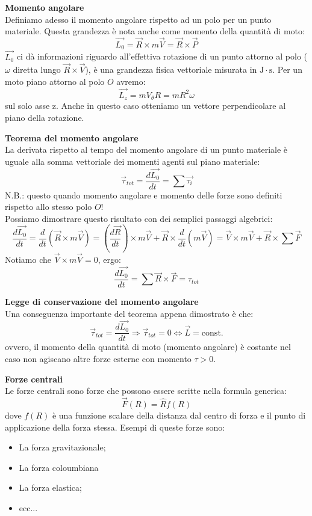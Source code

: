 \documentclass[a4paper,12pt]{article}
\begin{document}
\par\smallskip
\textbf{Momento angolare} \\
Definiamo adesso il momento angolare rispetto ad un polo per un punto materiale. Questa grandezza è nota anche come
momento della quantità di moto:
$$ \vec{L_0} = \vec{R} \times m\vec{V} = \vec{R} \times \vec{P} $$
$\vec{L_0}$ ci dà informazioni riguardo all'effettiva rotazione di un punto attorno al polo ($\omega$ diretta lungo $\vec{R}\times\vec{V}$),
è una grandezza fisica vettoriale misurata in $\mathrm{J}\cdot\mathrm{s}$. Per un moto piano attorno al polo $O$ avremo:
$$ \vec{L_z} = mV_{\theta}R = mR^2\omega$$
sul solo asse z. Anche in questo caso otteniamo un vettore perpendicolare al piano della rotazione.
\par\smallskip
\textbf{Teorema del momento angolare} \\
La derivata rispetto al tempo del momento angolare di un punto materiale è uguale alla somma vettoriale dei momenti agenti
sul piano materiale:
$$ \vec{\tau}_{tot} = \frac{d\vec{L_0}}{dt} = \sum \vec{\tau_i} $$
N.B.: questo quando momento angolare e momento delle forze sono definiti rispetto allo stesso polo $O$!\\
Possiamo dimostrare questo risultato con dei semplici passaggi algebrici:
$$ \frac{d\vec{L_0}}{dt} = \frac{d}{dt} (\vec{R} \times m\vec{V}) = (\frac{d\vec{R}}{dt}) \times m\vec{V} + \vec{R} \times \frac{d}{dt}(m\vec{V}) = \vec{V}\times m\vec{V}+\vec{R}\times\sum{\vec{F}} $$
Notiamo che $\vec{V} \times m\vec{V} = 0$, ergo:
$$ \frac{d\vec{L_0}}{dt} = \sum \vec{R} \times \vec{F} = \tau_{tot} $$
\par\smallskip
\textbf{Legge di conservazione del momento angolare} \\
Una conseguenza importante del teorema appena dimostrato è che:
$$ \vec{\tau}_{tot} = \frac{d\vec{L_0}}{dt} \Rightarrow \vec{\tau}_{tot} = 0 \Leftrightarrow \vec{L} = \mathrm{const.}$$
ovvero, il momento della quantità di moto (momento angolare) è costante nel caso non agiscano altre forze esterne con momento $\tau>0$.
\par\smallskip
\textbf{Forze centrali} \\
Le forze centrali sono forze che possono essere scritte nella formula generica:
$$ \vec{F}(R) = \hat{R}f(R)$$
dove $f(R)$ è una funzione scalare della distanza dal centro di forza e il punto di applicazione della forza stessa. Esempi
di queste forze sono:
\begin{itemize}
  \item La forza gravitazionale;
  \item La forza coloumbiana
  \item La forza elastica;
  \item ecc...
\end{itemize}
\end{document}
